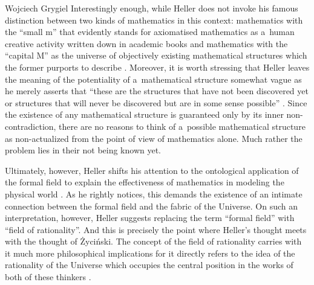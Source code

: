 \begin{artengenv}{Wojciech Grygiel}
Interestingly enough, while Heller does not invoke his famous distinction between two kinds of mathematics in this context: mathematics with the ``small m'' that evidently stands for axiomatised mathematics as a~human creative activity written down in academic books and mathematics with the ``capital M'' as the universe of objectively existing mathematical structures which the former purports to describe
\parencite[e.g.][]{heller_co_2010}. %
 Moreover, it is worth stressing that Heller leaves the meaning of the potentiality of a~mathematical structure somewhat vague as he merely asserts that ``these are the structures that have not been discovered yet or structures that will never be discovered but are in some sense possible'' 
\parencite[][pp.236–237]{heller_uchwycic_1997}. %
 Since the existence of any mathematical structure is guaranteed only by its inner non-contradiction, there are no reasons to think of a~possible mathematical structure as non-actualized from the point of view of mathematics alone. Much rather the problem lies in their not being known yet.

Ultimately, however, Heller shifts his attention to the ontological application of the formal field to explain the effectiveness of mathematics in modeling the physical world
\parencite[][p.237]{heller_uchwycic_1997}. %
 As he rightly notices, this demands the existence of an intimate connection between the formal field and the fabric of the Universe. On such an interpretation, however, Heller suggests replacing the term ``formal field'' with ``field of rationality''. And this is precisely the point where Heller's thought meets with the thought of Życiński. The concept of the field of rationality carries with it much more philosophical implications for it directly refers to the idea of the rationality of the Universe which occupies the central position in the works of both of these thinkers 
\parencites[e.g.][]{heller_czy_2006}[][]{zycinski_granice_2013}.%



\end{artengenv}
